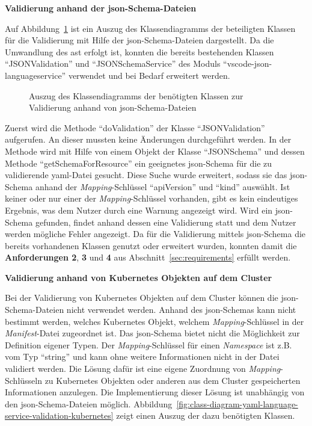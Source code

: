 \textbf{Validierung anhand der \ac{json}-Schema-Dateien}

Auf Abbildung~\ref{fig:class-diagram-yaml-language-service-validation} ist ein Auszug des Klassendiagramms der beteiligten Klassen
für die Validierung mit Hilfe der \ac{json}-Schema-Dateien dargestellt.
Da die Umwandlung des \ac{ast} erfolgt ist, konnten die bereits bestehenden Klassen ``JSONValidation'' und ``JSONSchemaService''
des Moduls ``vscode-json-languageservice'' verwendet und bei Bedarf erweitert werden.

\begin{figure}[htp] %
  \centering
  \caption{Auszug des Klassendiagramms der benötigten Klassen zur Validierung anhand von \ac{json}-Schema-Dateien}
  \label{fig:class-diagram-yaml-language-service-validation}
\end{figure}
Zuerst wird die Methode ``doValidation'' der Klasse ``JSONValidation'' aufgerufen.
An dieser mussten keine Änderungen durchgeführt werden. In der Methode wird mit Hilfe von einem Objekt der Klasse ``JSONSchema'' und dessen Methode ``getSchemaForResource'' ein geeignetes \ac{json}-Schema
für die zu validierende \ac{yaml}-Datei gesucht. Diese Suche wurde erweitert, sodass sie das \ac{json}-Schema anhand
der \textit{Mapping}-Schlüssel ``apiVersion'' und ``kind'' auswählt.
Ist keiner oder nur einer der \textit{Mapping}-Schlüssel vorhanden, gibt es kein eindeutiges Ergebnis, was dem Nutzer durch eine Warnung angezeigt wird.
Wird ein \ac{json}-Schema gefunden, findet anhand dessen eine Validierung statt und dem Nutzer werden mögliche Fehler angezeigt.
Da für die Validierung mittels \ac{json}-Schema die bereits vorhandenen Klassen genutzt oder erweitert wurden,
konnten damit die \textbf{Anforderungen 2}, \textbf{3} und \textbf{4} aus Abschnitt~\ref{sec:requirements} erfüllt werden.

\textbf{Validierung anhand von Kubernetes Objekten auf dem Cluster}

Bei der Validierung von Kubernetes Objekten auf dem Cluster können die \ac{json}-Schema-Dateien nicht verwendet werden.
Anhand des \ac{json}-Schemas kann nicht bestimmt werden, welches Kubernetes Objekt, welchem \textit{Mapping}-Schlüssel in der
\textit{Manifest}-Datei zugeordnet ist. Das \ac{json}-Schema bietet nicht die Möglichkeit zur Definition eigener Typen.
Der \textit{Mapping}-Schlüssel für einen \textit{Namespace} ist z.B. vom Typ ``string'' und kann ohne weitere Informationen nicht in der Datei validiert werden.
Die Lösung dafür ist eine eigene Zuordnung von \textit{Mapping}-Schlüsseln zu Kubernetes Objekten oder anderen aus dem Cluster gespeicherten Informationen anzulegen.
Die Implementierung dieser Lösung ist unabhängig von den \ac{json}-Schema-Dateien möglich.
Abbildung~\ref{fig:class-diagram-yaml-language-service-validation-kubernetes} zeigt einen Auszug der dazu benötigten Klassen.

